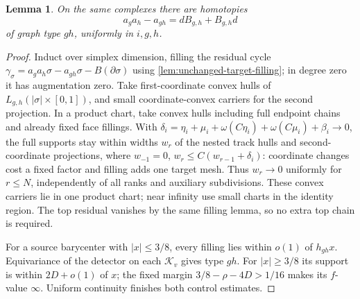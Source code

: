\documentclass[11pt]{amsart}
\numberwithin{equation}{section}
\newtheorem{lemma}[lemma]{Lemma}
\theoremstyle{definition}
\theoremstyle{remark}
\begin{document}
\begin{lemma}\label{geo:product-homotopies}
On the same complexes there are homotopies
\begin{equation}\label{geo:product-equation}
 a_ga_h-a_{gh}=dB_{g,h}+B_{g,h}d
\end{equation}
of graph type $gh$, uniformly in $i,g,h$.
\end{lemma}
\begin{proof}
Induct over simplex dimension, filling the residual cycle
$\gamma_\sigma=a_ga_h\sigma-a_{gh}\sigma-B(\partial\sigma)$ using
\cref{lem:unchanged-target-filling}; in degree zero it has augmentation
zero. Take first-coordinate convex hulls of
$L_{g,h}(|\sigma|\times[0,1])$, and small coordinate-convex carriers for the
second projection. In a product chart, take convex hulls including full
endpoint chains and already fixed face fillings. With
$\delta_i=\eta_i+\mu_i+\omega(C\eta_i)+\omega(C\mu_i)+\beta_i\to0$,
the full supports stay within widths $w_r$ of the nested track hulls
and second-coordinate projections, where
$w_{-1}=0$, $w_r\le C(w_{r-1}+\delta_i)$: coordinate changes cost a
fixed factor and filling adds one target mesh. Thus $w_r\to0$ uniformly
for $r\le N$, independently of all ranks and auxiliary subdivisions.
These convex carriers lie in one product chart; near infinity use
small charts in the identity region. The top residual vanishes by the
same filling lemma, so no extra top chain is required.

For a source barycenter with $|x|\le3/8$, every filling lies within
$o(1)$ of $h_{gh}x$. Equivariance of the detector on each $\mathcal K_v$ gives
type $gh$. For $|x|\ge3/8$ its support is within $2D+o(1)$ of $x$;
the fixed margin $3/8-\rho-4D>1/16$ makes its $f$-value $\infty$.
Uniform continuity finishes both control estimates.
\end{proof}
\end{document}
